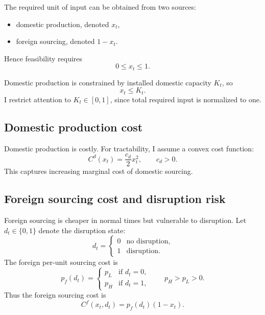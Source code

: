\documentclass[11pt]{article}
\begin{document}
The required unit of input can be obtained from two sources:
\begin{itemize}[leftmargin=2em]
    \item domestic production, denoted $x_t$,
    \item foreign sourcing, denoted $1-x_t$.
\end{itemize}
Hence feasibility requires
\begin{equation}
0 \le x_t \le 1.
\end{equation}

Domestic production is constrained by installed domestic capacity $K_t$, so
\begin{equation}
x_t \le K_t.
\end{equation}
I restrict attention to $K_t \in [0,1]$, since total required input is normalized to one.

\subsection{Domestic production cost}

Domestic production is costly. For tractability, I assume a convex cost function:
\begin{equation}
C^d(x_t) = \frac{c_d}{2}x_t^2, \qquad c_d >0.
\end{equation}
This captures increasing marginal cost of domestic sourcing.

\subsection{Foreign sourcing cost and disruption risk}

Foreign sourcing is cheaper in normal times but vulnerable to disruption. Let $d_t \in \{0,1\}$ denote the disruption state:
\[
d_t =
\begin{cases}
0 & \text{no disruption},\\
1 & \text{disruption}.
\end{cases}
\]
The foreign per-unit sourcing cost is
\begin{equation}
p_f(d_t)=
\begin{cases}
p_L & \text{if } d_t=0,\\
p_H & \text{if } d_t=1,
\end{cases}
\qquad p_H>p_L>0.
\end{equation}
Thus the foreign sourcing cost is
\begin{equation}
C^f(x_t,d_t)=p_f(d_t)(1-x_t).
\end{equation}
\end{document}
